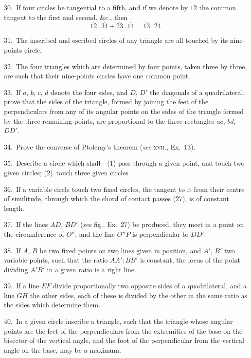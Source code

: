 \documentclass[oneside]{book}
\begin{document}
\begin{footnotesize}
30.~If four circles be tangential to a fifth, and if we denote by
$\overline{12}$ the common tangent to the first and second, \&c., then
\[
  \overline{12} \,.\, \overline{34}
+ \overline{23} \,.\, \overline{14}
= \overline{13} \,.\, \overline{24}.
\]

31.~The inscribed and escribed circles of any triangle are all
touched by its nine-points circle.

32.~The four triangles which are determined by four points,
taken three by three, are such that their nine-points circles
have one common point.

33.~If $a$, $b$, $c$, $d$ denote the four sides, and $D$, $D'$ the diagonals
of a quadrilateral; prove that the sides of the triangle, formed by
joining the feet of the perpendiculars from any of its angular
points on the sides of the triangle formed by the three remaining
points, are proportional to the three rectangles $ac$, $bd$, $DD'$.

34.~Prove the converse of Ptolemy's theorem (\emph{see} \textsc{xvii.}, Ex.~13).

35.~Describe a circle which shall---(1) pass through a given
point, and touch two given circles; (2)~touch three given
circles.

36.~If a variable circle touch two fixed circles, the tangent to
it from their centre of similitude, through which the chord of contact
passes (27), is of constant length.


37.~If the lines $AD$, $BD'$ (\emph{see} fig., Ex.~27) be produced, they
meet in a point on the circumference of $O''$, and the line $O''P$ is
perpendicular to $DD'$.

38.~If $A$, $B$ be two fixed points on two lines given in position,
and $A'$, $B'$ two variable points, such that the ratio $AA' : BB'$ is
constant, the locus of the point dividing $A'B'$ in a given ratio is a
right line.

39.~If a line $EF$ divide proportionally two opposite sides of a
quadrilateral, and a line $GH$ the other sides, each of these is
divided by the other in the same ratio as the sides which determine
them.

40.~In a given circle inscribe a triangle, such that the triangle
whose angular points are the feet of the perpendiculars from the
extremities of the base on the bisector of the vertical angle, and
the foot of the perpendicular from the vertical angle on the base,
may be a maximum.


\end{footnotesize}
\end{document}
